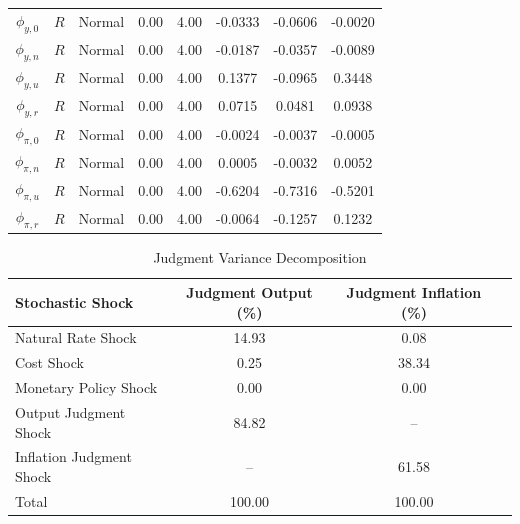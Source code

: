 \documentclass[10pt]{article}
\begin{document}
{\begin{table}
\begin{center}
\begin{tabular}{c|c||c|cc||c|cc}
$\phi_{y,0}$ & $R$ & Normal & 0.00 & 4.00 & -0.0333 & -0.0606 & -0.0020 \\ 
$\phi_{y,n}$ & $R$ & Normal & 0.00 & 4.00 & -0.0187 & -0.0357 & -0.0089 \\ 
$\phi_{y,u}$ & $R$ & Normal & 0.00 & 4.00 & 0.1377 & -0.0965 & 0.3448 \\ 
$\phi_{y,r}$ & $R$ & Normal & 0.00 & 4.00 & 0.0715 & 0.0481 & 0.0938 \\ 
$\phi_{\pi,0}$ & $R$ & Normal & 0.00 & 4.00 & -0.0024 & -0.0037 & -0.0005 \\ 
$\phi_{\pi,n}$ & $R$ & Normal & 0.00 & 4.00 & 0.0005 & -0.0032 & 0.0052 \\ 
$\phi_{\pi,u}$ & $R$ & Normal & 0.00 & 4.00 & -0.6204 & -0.7316 & -0.5201 \\ 
$\phi_{\pi,r}$ & $R$ & Normal & 0.00 & 4.00 & -0.0064 & -0.1257 & 0.1232 \\ \hline
\end{tabular}
\end{center}
\end{table}

\begin{table}\caption{Judgment Variance Decomposition}\label{tb:newsdec}
\begin{center}
\vspace*{1pc}
\begin{tabular}{l|c|cc} \hline
Stochastic Shock & Judgment Output (\%) & Judgment Inflation (\%) \\ \hline
Natural Rate Shock & 14.93 & 0.08  \\
Cost Shock & 0.25 & 38.34  \\
Monetary Policy Shock & 0.00 & 0.00 \\
Output Judgment Shock & 84.82 & -- \\
Inflation Judgment Shock & -- & 61.58 \\ \hline
Total & 100.00 & 100.00 \\ \hline
\end{tabular}
\end{center}
\end{table}

}
\end{document}

